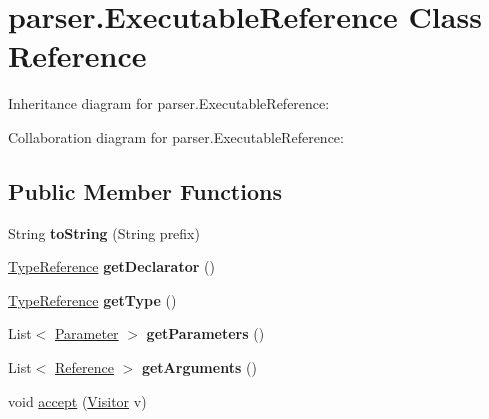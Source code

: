 \hypertarget{classparser_1_1_executable_reference}{}\section{parser.\+Executable\+Reference Class Reference}
\label{classparser_1_1_executable_reference}


Inheritance diagram for parser.\+Executable\+Reference\+:


Collaboration diagram for parser.\+Executable\+Reference\+:
\subsection*{Public Member Functions}
\begin{DoxyCompactItemize}
\item 
String {\bfseries to\+String} (String prefix)\hypertarget{classparser_1_1_executable_reference_a6cd52ed5f0ed61af4822b75f7f05d2d3}{}\label{classparser_1_1_executable_reference_a6cd52ed5f0ed61af4822b75f7f05d2d3}

\item 
\hyperlink{classparser_1_1_type_reference}{Type\+Reference} {\bfseries get\+Declarator} ()\hypertarget{classparser_1_1_executable_reference_a6f0acf35c93a64a67d566d6ddec6c7d7}{}\label{classparser_1_1_executable_reference_a6f0acf35c93a64a67d566d6ddec6c7d7}

\item 
\hyperlink{classparser_1_1_type_reference}{Type\+Reference} {\bfseries get\+Type} ()\hypertarget{classparser_1_1_executable_reference_aa2e219df5dddfca05dd2b412b77a8243}{}\label{classparser_1_1_executable_reference_aa2e219df5dddfca05dd2b412b77a8243}

\item 
List$<$ \hyperlink{classparser_1_1_parameter}{Parameter} $>$ {\bfseries get\+Parameters} ()\hypertarget{classparser_1_1_executable_reference_a40d3a4e4211b291e8a2fa2403ca68c17}{}\label{classparser_1_1_executable_reference_a40d3a4e4211b291e8a2fa2403ca68c17}

\item 
List$<$ \hyperlink{classparser_1_1_reference}{Reference} $>$ {\bfseries get\+Arguments} ()\hypertarget{classparser_1_1_executable_reference_a5c841d6f2b44cb9c66249c164a813359}{}\label{classparser_1_1_executable_reference_a5c841d6f2b44cb9c66249c164a813359}

\item 
void \hyperlink{classparser_1_1_executable_reference_af36e0b7ffc42c12dbbbac34d0614a68b}{accept} (\hyperlink{interfacemain_1_1_visitor}{Visitor} v)
\end{DoxyCompactItemize}
